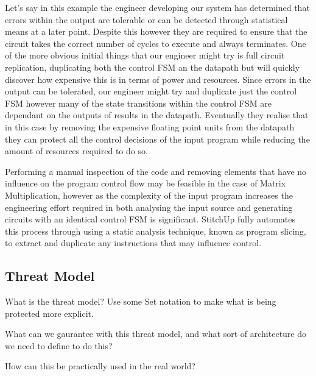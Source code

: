 Let's say in this example the engineer developing our system has determined that errors within
the output are tolerable or can be detected through statistical means at a later point.
Despite this however they are required to ensure that the circuit takes the correct number of cycles to
execute and always terminates.
One of the more obvious initial things that our engineer might try is full circuit replication, duplicating both the
control FSM an the datapath but will quickly discover how expensive this is in terms of power and resources.
Since errors in the output can be tolerated, our engineer might try and duplicate just the control FSM however
many of the state transitions within the control FSM are dependant on the outputs of results in the datapath.
Eventually  they realise that in this case by removing the expensive floating point units from the datapath
they can protect all the control decisions of the input program while reducing the amount of resources required
to do so.

Performing a manual inspection of the code and removing elements that have no influence on the program control flow
may be feasible in the case of Matrix Multiplication, however as the complexity of the input program increases
the engineering effort required in both analysing the input source and generating circuits with an identical control FSM is
significant.
StitchUp fully automates this process through using a static analysis technique, known as program slicing, to extract
and duplicate any instructions that may influence control.


\subsection{Threat Model}
What is the threat model?
Use some Set notation to make what is being protected more explicit.

What can we gaurantee with this threat model, and what sort of architecture
do we need to define to do this?

How can this be practically used in the real world?

